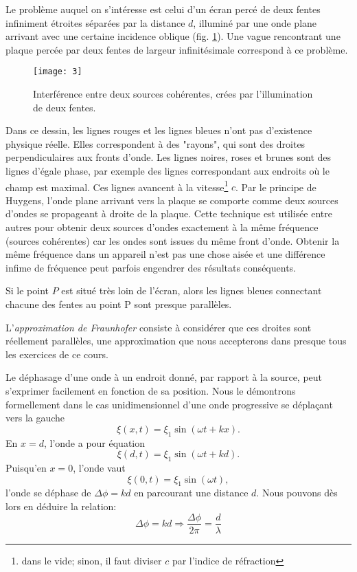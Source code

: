 Le problème auquel on s'intéresse est celui d'un écran percé de deux fentes infiniment étroites séparées par la distance $d$, illuminé par une onde plane arrivant avec une certaine incidence oblique (fig. \ref{3}). Une vague rencontrant une plaque percée par deux fentes de largeur infinitésimale correspond à ce problème.

\begin{figure}[htb]
\centering
\texttt{[image: 3]}
\caption{Interférence entre deux sources cohérentes, crées par l'illumination de deux fentes.}
\label{3}
\end{figure}

Dans ce dessin, les lignes rouges et les lignes bleues n'ont pas d'existence physique réelle. Elles correspondent à des "rayons", qui sont des droites perpendiculaires aux fronts d'onde. Les lignes noires, roses et brunes sont des lignes d'égale phase, par exemple des lignes correspondant aux endroits où le champ est maximal. Ces lignes avancent à la vitesse\footnote{dans le vide; sinon, il faut diviser $c$ par l'indice de réfraction} $c$. Par le principe de Huygens, l'onde plane arrivant vers la plaque se comporte comme deux sources d'ondes se propageant à droite de la plaque. Cette technique est utilisée entre autres pour obtenir deux sources d'ondes exactement à la même fréquence (sources cohérentes) car les ondes sont issues du même front d'onde. Obtenir la même fréquence dans un appareil n'est pas une chose aisée et une différence infime de fréquence peut parfois engendrer des résultats conséquents.

Si le point $P$ est situé très loin de l'écran, alors les lignes bleues connectant chacune des fentes au point P sont presque parallèles. 

L'\textit{approximation de Fraunhofer} consiste à considérer que ces droites sont réellement parallèles, une approximation que nous accepterons dans presque tous les exercices de ce cours.

Le déphasage d'une onde à un endroit donné, par rapport à la source, peut s'exprimer facilement en fonction de sa position. Nous le démontrons formellement dans le cas unidimensionnel d'une onde progressive se déplaçant vers la gauche
$$\xi(x,t)=\xi_1\sin(\omega t+kx).$$
En $x=d$, l'onde a pour équation 
$$ \xi(d,t)=\xi_1\sin(\omega t+kd).$$ 
Puisqu'en $x=0$, l'onde vaut 
$$ \xi(0,t)=\xi_1\sin(\omega t),$$ 
l'onde se déphase de $\Delta \phi=kd$ en parcourant une distance $d$. Nous pouvons dès lors en déduire la relation:
$$\Delta\phi=kd\Rightarrow\frac{\Delta\phi}{2\pi}=\frac{d}{\lambda}$$ 


